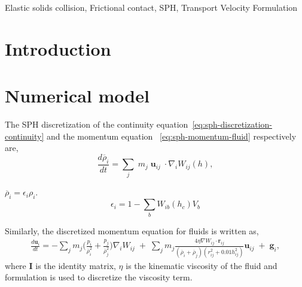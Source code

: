 \documentclass[preprint,12pt]{elsarticle}
\newcommand{\ten}[1]{\ensuremath{\mathbf{#1}}}
\begin{document}
\begin{frontmatter}

  \title{}
  \author[IITB]{Dinesh Adepu}
  \author[University of Surrey]{Chuan Yu Wu}
\address[UoS]{Department of Aerospace Engineering, Indian Institute of
  Technology Bombay, Powai, Mumbai 400076}



\begin{abstract}

\end{abstract}

\begin{keyword}
{Elastic solids collision}, {Frictional contact}, {SPH}, {Transport Velocity Formulation}


\end{keyword}

\end{frontmatter}


\section{Introduction}
\label{sec:intro}


\section{Numerical model}
\label{sec:numerical_model}
The SPH discretization of the continuity
equation~\cref{eq:sph-discretization-continuity} and the momentum equation
~\cref{eq:sph-momentum-fluid} respectively are,
\begin{equation}
  \label{eq:sph-discretization-continuity}
  \frac{d\overline{\rho}_i}{dt} = \sum_{j} \;
   m_j \; {\ten{u}}_{ij} \; \cdot \nabla_{i} W_{ij}(h),
\end{equation}

$\overline{\rho}_i=\epsilon_i \rho_i$.
\begin{equation}
  \label{eq:fluid-porosity}
  \epsilon_i = 1 - \sum_b W_{ib}(h_c) V_b
\end{equation}

%
Similarly, the discretized momentum equation for fluids is written as,
\begin{multline}
  \label{eq:sph-momentum-fluid}
  \frac{d\ten{u}_{i}}{dt} = - \sum_{j} m_j
  \bigg(\frac{p_i}{\overline{\rho}_i^2} + \frac{p_j}{\overline{\rho}_j^2}\bigg)
  \nabla_{i} W_{ij}
 \;+\;
  \sum_{j} m_j \frac{4 \eta \nabla W_{ij}\cdot
    \ten{r}_{ij}}{(\overline{\rho}_i + \overline{\rho}_j) (r_{ij}^2 + 0.01 h_{ij}^2)} \ten{u}_{ij}  \;+\;
  \ten{g}_{i},
\end{multline}
where $\ten{I}$ is the identity matrix, $\eta$ is the kinematic viscosity of the
fluid and \cite{morris1997modeling} formulation is used to discretize the
viscosity term.
\end{document}
